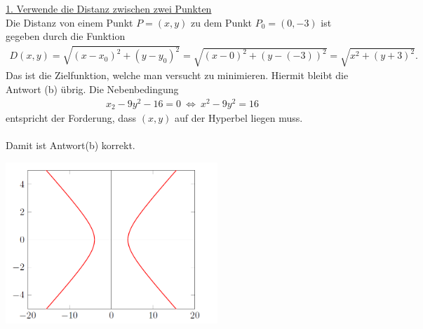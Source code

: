 \underline{1. Verwende die Distanz zwischen zwei Punkten}\\
Die Distanz von einem Punkt $P=(x,y)$ zu dem Punkt $P_0 = (0,-3)$ ist gegeben durch
die Funktion
\begin{align*}
	D(x,y) = \sqrt{(x-x_0)^2 + (y-y_0)^2}
	=
	 \sqrt{(x-0)^2 + (y-(-3))^2}
	=
	\sqrt{x^2 + (y+3)^2}.
\end{align*}
Das ist die Zielfunktion, welche man versucht zu minimieren. Hiermit bleibt die Antwort (b) übrig. 
Die Nebenbedingung 
\begin{align*}
	x_2 - 9y^2  - 16  = 0 
	\ \Leftrightarrow \
	x^2 -9y^2 = 16
\end{align*}
entspricht der Forderung, dass $(x,y) $ auf der Hyperbel liegen muss.\\
\\
Damit ist Antwort(b) korrekt.
\begin{center}
	\includegraphics[width=0.6\textwidth]{pictures/aufgabe2_1_1}
\end{center}

\newpage


